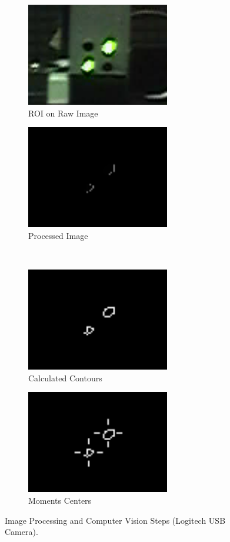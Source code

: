 \documentclass[botnum, fleqn]{unmeethesis}
\begin{document}
\small
\begin{figure}
    \begin{subfigure}{0.49\textwidth}
        \centering
        \includegraphics[height=45mm]{figures/vis.png}
        \caption{\small ROI on Raw Image}
    \end{subfigure}
    \begin{subfigure}{0.49\textwidth}
        \centering
        \includegraphics[height=45mm]{figures/proces.png}
        \caption{\small Processed Image}
    \end{subfigure} \\
    \begin{subfigure}{0.49\textwidth}
        \centering
        \includegraphics[height=45mm]{figures/closed.png}
        \caption{\small Calculated Contours}
    \end{subfigure}
    \begin{subfigure}{0.49\textwidth}
        \centering
        \includegraphics[height=45mm]{figures/contLines.png}
        \caption{\small Moments Centers}
    \end{subfigure}
    \caption{\label{centers}Image Processing and Computer Vision Steps (Logitech USB Camera).}
\end{figure}
\end{document}
